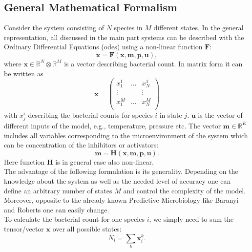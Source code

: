 \documentclass[10pt,A4paper]{article}
\numberwithin{equation}{section}
\newcommand{\mbx}{\mathbf{x}}
\newcommand{\mbm}{\mathbf{m}}
\newcommand{\mbp}{\mathbf{p}}
\newcommand{\mbu}{\mathbf{u}}
\newcommand{\mbF}{\mathbf{F}}
\newcommand{\mbH}{\mathbf{H}}
\begin{document}
\subsection{General Mathematical Formalism}  \label{ssec:supplement1}
Consider the system consisting of $N$ species in $M$ different states.
In the general representation, all discussed in the main part systems  can be described with the Ordinary Differential Equations (\acp{ode}) using a non-linear function $\mbF$:
\begin{equation}
   \dot{\mbx} = \mbF(\mbx, \mbm, \mbp, \mbu),
\label{eq:model_ODE_x}
\end{equation}
where  $\mbx \in \mathbb{R}^{N}  \otimes \mathbb{R}^{M}$ is a vector describing bacterial count.
In matrix form it can be written as
\begin{equation}
    \mbx = \begin{pmatrix}
        x^1_1  & \dots & x^1_N  \\
        \vdots &       & \vdots \\
        x^M_1  & \dots & x^M_N  \\
            \end{pmatrix}
    \label{eq:model_bact}
\end{equation}
with $x_{j}^{i}$ describing the bacterial counts for species $i$ in state $j$.
$\mbu$ is the vector of different inputs of the model, e.g., temperature, pressure etc.
The vector $\mbm \in \mathbb{R}^{K}$ includes all variables corresponding to the microenvironment of the system which can be concentration of the inhibitors or activators:
\begin{equation}
    \dot{\mbm} = \mbH (\mbx, \mbm, \mbp, \mbu).
    \label{eq:model_microenv}
\end{equation}
Here function $\mbH$ is in general case also non-linear.\\
%
The advantage of the following formulation is its generality.
Depending on the knowledge about the system as well as the needed level of accuracy one can define an arbitrary number of states $M$ and control the complexity of the model.
Moreover, opposite to the already known Predictive Microbiology like Baranyi and Roberts one can easily change.\\
%
To calculate the bacterial count for one species $i$, we simply need to sum the tensor/vector $\mbx$ over all possible states:
\begin{equation}
    N_i = \sum_k \mbx_i^k.
\label{eq:N_pro_species}
\end{equation}
\end{document}
